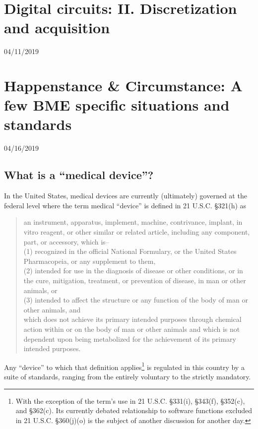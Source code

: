 \documentclass[11pt]{book}
\begin{document}
\chapter{Digital circuits: II. Discretization and acquisition}
04/11/2019


\chapter{Happenstance \& Circumstance: A few BME specific situations and standards}
04/16/2019
\minitoc
\newpage

\section{What is a ``medical device''?}
In the United States, medical devices are currently (ultimately) governed at the federal level where the term medical ``device'' is defined in 21 U.S.C. \S 321(h) as

\begin{quote}
	an instrument, apparatus, implement, machine, contrivance, implant, in vitro reagent, or other similar or related article, including any component, part, or accessory, which is--
	\\
	
(1) recognized in the official National Formulary, or the United States Pharmacopeia, or any supplement to them,\\

(2) intended for use in the diagnosis of disease or other conditions, or in the cure, mitigation, treatment, or prevention of disease, in man or other animals, or\\

(3) intended to affect the structure or any function of the body of man or other animals, and \\

which does not achieve its primary intended purposes through chemical action within or on the body of man or other animals and which is not dependent upon being metabolized for the achievement of its primary intended purposes.
\end{quote}

Any ``device'' to which that definition applies\footnote{With the exception of the term's use in 21 U.S.C. \S331(i), \S343(f), \S352(c), and \S362(c). Its currently debated relationship to software functions excluded in 21 U.S.C. \S 360(j)(o) is the subject of another discussion for another day.} is regulated in this country by a suite of standards, ranging from the entirely voluntary to the strictly mandatory.
\end{document}
